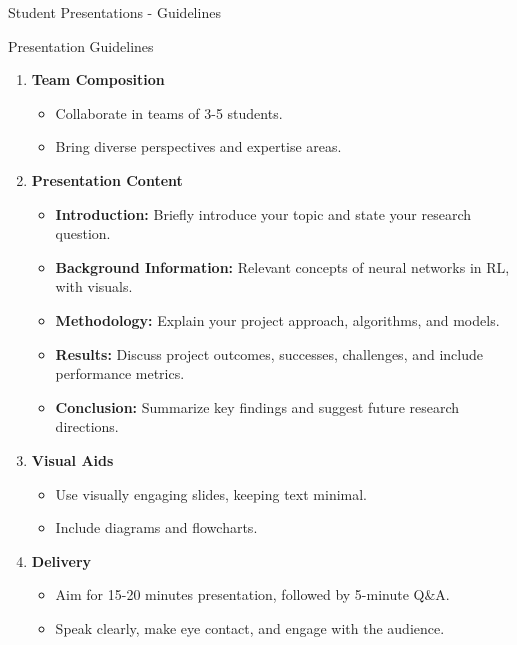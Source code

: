\documentclass[aspectratio=169]{beamer}
\begin{document}
\begin{frame}[fragile]{Student Presentations - Guidelines}
    \begin{block}{Presentation Guidelines}
        \begin{enumerate}
            \item \textbf{Team Composition}
                \begin{itemize}
                    \item Collaborate in teams of 3-5 students.
                    \item Bring diverse perspectives and expertise areas.
                \end{itemize}
            \item \textbf{Presentation Content}
                \begin{itemize}
                    \item \textbf{Introduction:} Briefly introduce your topic and state your research question.
                    \item \textbf{Background Information:} Relevant concepts of neural networks in RL, with visuals.
                    \item \textbf{Methodology:} Explain your project approach, algorithms, and models.
                    \item \textbf{Results:} Discuss project outcomes, successes, challenges, and include performance metrics.
                    \item \textbf{Conclusion:} Summarize key findings and suggest future research directions.
                \end{itemize}
            \item \textbf{Visual Aids}
                \begin{itemize}
                    \item Use visually engaging slides, keeping text minimal.
                    \item Include diagrams and flowcharts.
                \end{itemize}
            \item \textbf{Delivery}
                \begin{itemize}
                    \item Aim for 15-20 minutes presentation, followed by 5-minute Q\&A.
                    \item Speak clearly, make eye contact, and engage with the audience.
                \end{itemize}
        \end{enumerate}
    \end{block}
\end{frame}
\end{document}
